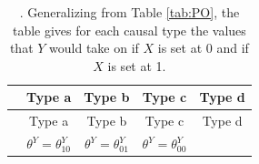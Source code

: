 \documentclass[
  12pt,
]{book}
\begin{document}
\begin{longtable}[]{@{}lcccc@{}}
\caption{\label{tab:POGEN}. Generalizing from Table \ref{tab:PO}, the table gives for each causal type the values that \(Y\) would take on if \(X\) is set at \(0\) and if \(X\) is set at 1.}\tabularnewline
\toprule
\begin{minipage}[b]{0.10\columnwidth}\raggedright
\small\strut
\end{minipage} & \begin{minipage}[b]{0.19\columnwidth}\centering
Type a\strut
\end{minipage} & \begin{minipage}[b]{0.21\columnwidth}\centering
Type b\strut
\end{minipage} & \begin{minipage}[b]{0.18\columnwidth}\centering
Type c\strut
\end{minipage} & \begin{minipage}[b]{0.18\columnwidth}\centering
Type d\strut
\end{minipage}\tabularnewline
\midrule
\endfirsthead
\toprule
\begin{minipage}[b]{0.10\columnwidth}\raggedright
\small\strut
\end{minipage} & \begin{minipage}[b]{0.19\columnwidth}\centering
Type a\strut
\end{minipage} & \begin{minipage}[b]{0.21\columnwidth}\centering
Type b\strut
\end{minipage} & \begin{minipage}[b]{0.18\columnwidth}\centering
Type c\strut
\end{minipage} & \begin{minipage}[b]{0.18\columnwidth}\centering
Type d\strut
\end{minipage}\tabularnewline
\midrule
\endhead
\begin{minipage}[t]{0.10\columnwidth}\raggedright
\strut
\end{minipage} & \begin{minipage}[t]{0.19\columnwidth}\centering
\(\theta^Y=\theta^Y_{10}\)\strut
\end{minipage} & \begin{minipage}[t]{0.21\columnwidth}\centering
\(\theta^Y=\theta^Y_{01}\)\strut
\end{minipage} & \begin{minipage}[t]{0.18\columnwidth}\centering
\(\theta^Y=\theta^Y_{00}\)\strut
\end{minipage} & \begin{minipage}[t]{0.18\columnwidth}\centering

\end{minipage}
\end{longtable}
\end{document}
